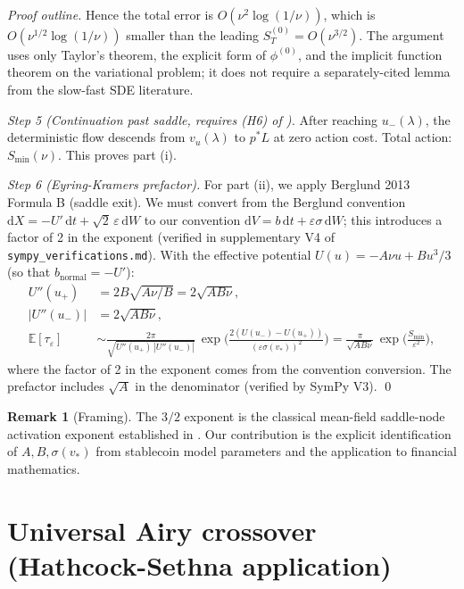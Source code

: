 \documentclass[11pt,a4paper]{article}
\theoremstyle{plain}
\theoremstyle{definition}
\newtheorem{remark}[theorem]{Remark}
\newcommand{\E}{\mathbb{E}}
\newcommand{\eps}{\varepsilon}
\renewcommand{\d}{\mathrm{d}}
\begin{document}
\begin{proof}[Proof outline]
Hence the total error is $O(\nu^2\log(1/\nu))$, which is $O(\nu^{1/2}\log(1/\nu))$ smaller than the leading $S_T^{(0)} = O(\nu^{3/2})$. The argument uses only Taylor's theorem, the explicit form of $\phi^{(0)}$, and the implicit function theorem on the variational problem; it does not require a separately-cited lemma from the slow-fast SDE literature.

\textit{Step 5 (Continuation past saddle, requires (H6) of ).} After reaching $u_-(\lambda)$, the deterministic flow descends from $v_u(\lambda)$ to $p^*L$ at zero action cost. Total action: $S_{\min}(\nu)$. This proves part (i).

\textit{Step 6 (Eyring-Kramers prefactor).} For part (ii), we apply Berglund 2013 \cite{Berglund2013} Formula B (saddle exit). We must convert from the Berglund convention $\d X = -U'\,\d t + \sqrt 2\,\eps\,\d W$ to our convention $\d V = b\,\d t + \eps\sigma\,\d W$; this introduces a factor of 2 in the exponent (verified in supplementary V4 of \texttt{sympy\_verifications.md}). With the effective potential $U(u) = -A\nu u + Bu^3/3$ (so that $b_{\text{normal}} = -U'$):
\begin{align*}
U''(u_+) &= 2B\sqrt{A\nu/B} = 2\sqrt{AB\nu},\\
|U''(u_-)| &= 2\sqrt{AB\nu},\\
\E[\tau_\eps] &\sim \frac{2\pi}{\sqrt{U''(u_+)\,|U''(u_-)|}}\,\exp\!\Big(\frac{2(U(u_-) - U(u_+))}{(\eps\sigma(v_*))^2}\Big) = \frac{\pi}{\sqrt{AB\nu}}\,\exp\!\Big(\frac{S_{\min}}{\eps^2}\Big),
\end{align*}
where the factor of 2 in the exponent comes from the convention conversion. The prefactor includes $\sqrt A$ in the denominator (verified by SymPy V3).
\qed
\end{proof}

\begin{remark}[Framing]
The $3/2$ exponent is the classical mean-field saddle-node activation exponent established in \cite{DykmanMoriRossHunt1994, BerglundGentz2009Neuro, AssafMeerson2010}.
Our contribution is the explicit identification of $A, B, \sigma(v_*)$ from stablecoin model parameters and the application to financial mathematics.
\end{remark}

\section{Universal Airy crossover (Hathcock-Sethna application)}
\label{sec:airy}
\end{document}
